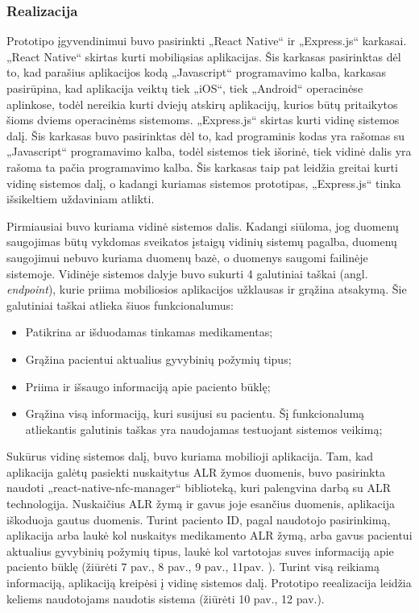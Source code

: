 \subsubsection{Realizacija}
Prototipo įgyvendinimui buvo pasirinkti „React Native“ ir „Express.js“ karkasai. „React Native“ skirtas kurti mobiliąsias aplikacijas. Šis karkasas pasirinktas dėl to, kad parašius aplikacijos kodą „Javascript“ programavimo kalba, karkasas pasirūpina, kad aplikacija veiktų tiek „iOS“, tiek „Android“ operacinėse aplinkose, todėl nereikia kurti dviejų atskirų aplikacijų, kurios būtų pritaikytos šioms dviems operacinėms sistemoms. „Express.js“ skirtas kurti vidinę sistemos dalį. Šis karkasas buvo pasirinktas dėl to, kad programinis kodas yra rašomas su „Javascript“ programavimo kalba, todėl sistemos tiek išorinė, tiek vidinė dalis yra rašoma ta pačia programavimo kalba. Šis karkasas taip pat leidžia greitai kurti vidinę sistemos dalį, o kadangi kuriamas sistemos prototipas, „Express.js“ tinka išsikeltiem uždaviniam atlikti.


Pirmiausiai buvo kuriama vidinė sistemos dalis. Kadangi siūloma, jog duomenų saugojimas būtų vykdomas sveikatos įstaigų vidinių sistemų pagalba, duomenų saugojimui nebuvo kuriama duomenų bazė, o duomenys saugomi failinėje sistemoje. Vidinėje sistemos dalyje buvo sukurti 4 galutiniai taškai (angl. \textit{endpoint}), kurie priima mobiliosios aplikacijos užklausas ir grąžina atsakymą. Šie galutiniai taškai atlieka šiuos funkcionalumus: 
\begin{itemize}
    \item Patikrina ar išduodamas tinkamas medikamentas;
    \item Grąžina pacientui aktualius gyvybinių požymių tipus;
    \item Priima ir išsaugo informaciją apie paciento būklę;
    \item Grąžina visą informaciją, kuri susijusi su pacientu. Šį funkcionalumą atliekantis galutinis taškas yra naudojamas testuojant sistemos veikimą;
\end{itemize}
Sukūrus vidinę sistemos dalį, buvo kuriama mobilioji aplikacija. Tam, kad aplikacija galėtų pasiekti nuskaitytus ALR žymos duomenis, buvo pasirinkta naudoti „react-native-nfc-manager“ biblioteką,  kuri palengvina darbą su ALR technologija. Nuskaičius ALR žymą ir gavus joje esančius duomenis, aplikacija iškoduoja gautus duomenis. Turint paciento ID, pagal naudotojo pasirinkimą, aplikacija arba laukė kol nuskaitys medikamento ALR žymą, arba gavus pacientui aktualius gyvybinių požymių tipus, laukė kol vartotojas suves informaciją apie paciento būklę (žiūrėti 7 pav., 8 pav., 9 pav., 11pav. ). Turint visą reikiamą informaciją, aplikaciją kreipėsi į vidinę sistemos dalį. Prototipo reealizacija leidžia keliems naudotojams naudotis sistema (žiūrėti 10 pav., 12 pav.).



